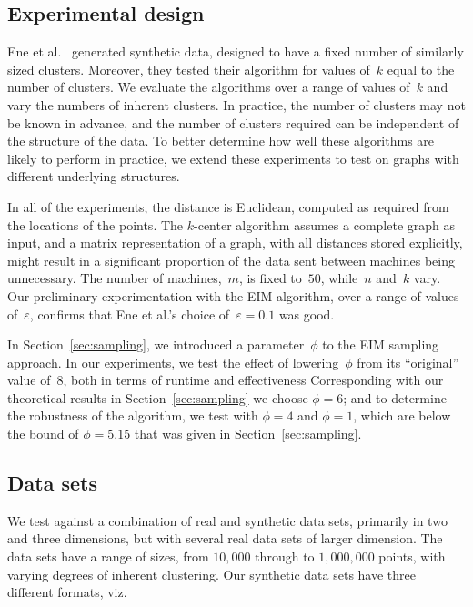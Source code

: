 \documentclass[11pt]{article}
\newcommand{\eps}{\ensuremath{\varepsilon}}
\newcommand{\ene}{{\sc EIM}\xspace}
\begin{document}
\subsection{Experimental design}
Ene et al.~\cite{ene2011fast} generated synthetic data,
designed to have a fixed number of similarly sized clusters.
Moreover, they  tested their algorithm for values of~$k$ equal to the number of clusters.
We evaluate the algorithms over a range of values of~$k$ and vary the numbers of inherent clusters.
In practice, the number of clusters may not be known in advance, and the number of clusters required can be independent of the structure of the data.
To better determine how well these algorithms are likely to perform in practice,
we extend these experiments to test on  graphs with different underlying structures.


In all of the experiments, the distance is Euclidean, computed as required
from the locations of the points.
The $k$-center algorithm assumes a complete graph as input, and a matrix
representation of a graph, with all distances stored explicitly,
might result in a significant proportion of the data sent between machines being unnecessary.
The number of machines,~$m$, is fixed to~$50$, while~$n$ and~$k$ vary.
Our preliminary experimentation with the \ene algorithm, over a range of values of~$\eps$,
confirms that Ene et al.'s choice of~$\eps=0.1$ was good.



In Section~\ref{sec:sampling}, we introduced a parameter~$\phi$ to the \ene sampling
approach.
In our experiments, we test the effect of lowering~$\phi$ from its
``original'' value of~$8$, both in terms of runtime and effectiveness
Corresponding with our theoretical results in Section~\ref{sec:sampling} we
choose $\phi=6$; and to determine the robustness of the algorithm, we test
with $\phi=4$ and $\phi=1$, which are below the bound of $\phi=5.15$ that was given in Section~\ref{sec:sampling}.




\subsection{Data sets}

We test against a combination of real and synthetic data sets,
primarily in two and three dimensions,
but with several real data sets of larger dimension.
The data sets have a range of sizes, from $10,\!000$ through to
$1,\!000,\!000$ points, with varying degrees of inherent clustering.
Our synthetic  data sets have three different formats, viz.
\end{document}
